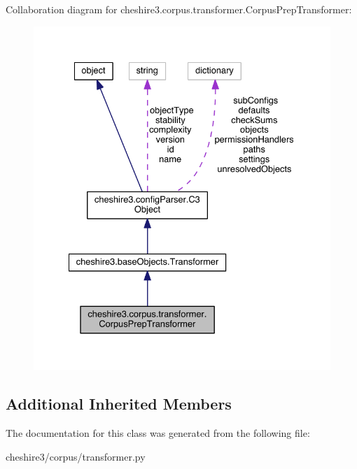 Collaboration diagram for cheshire3.\-corpus.\-transformer.\-Corpus\-Prep\-Transformer\-:
\nopagebreak
\begin{figure}[H]
\begin{center}
\leavevmode
\includegraphics[width=331pt]{classcheshire3_1_1corpus_1_1transformer_1_1_corpus_prep_transformer__coll__graph}
\end{center}
\end{figure}
\subsection*{Additional Inherited Members}


The documentation for this class was generated from the following file\-:\begin{DoxyCompactItemize}
\item 
cheshire3/corpus/transformer.\-py\end{DoxyCompactItemize}

